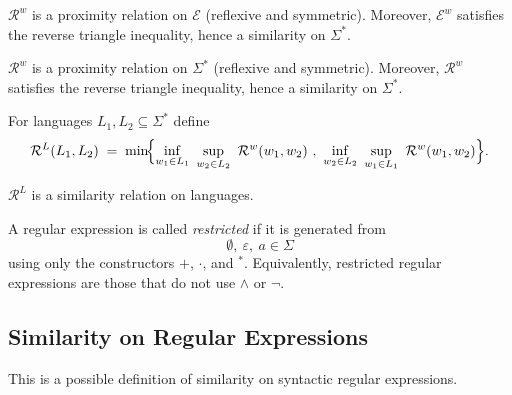 \begin{lemma}\label{lem:RE-sim}
$\mathcal{R}^w$ is a proximity relation on $\mathcal E$ (reflexive and symmetric).
Moreover, $\mathcal{E}^w$ satisfies the reverse triangle inequality, hence a similarity on $\Sigma^*$.
\end{lemma}

\begin{lemma}\label{lem:Rw-sim}
$\mathcal{R}^w$ is a proximity relation on $\Sigma^*$ (reflexive and symmetric).
Moreover, $\mathcal{R}^w$ satisfies the reverse triangle inequality, hence a similarity on $\Sigma^*$.
\end{lemma}

\begin{definition}\label{def:RL}
For languages $L_1,L_2\subseteq \Sigma^*$ define
\[
\mathcal{R}^L(L_1,L_2)\;=\;
\min\!\Bigl\{
\inf_{w_1\in L_1}\ \sup_{w_2\in L_2}\ \mathcal{R}^w(w_1,w_2)\ ,\
\inf_{w_2\in L_2}\ \sup_{w_1\in L_1}\ \mathcal{R}^w(w_1,w_2)
\Bigr\}.
\]
\end{definition}

\begin{lemma} $\mathcal R^L$ is a similarity relation on languages.
\end{lemma}

\begin{definition}
A regular expression is called \emph{restricted} if it is generated from
\[
\emptyset,\ \varepsilon,\ a \in \Sigma
\]
using only the constructors $+$, $\cdot$, and ${}^\ast$.
Equivalently, restricted regular expressions are those that do not use $\wedge$ or $\neg$.
\end{definition}

\subsection{Similarity on Regular Expressions}
This is a possible definition of similarity on syntactic regular expressions.

